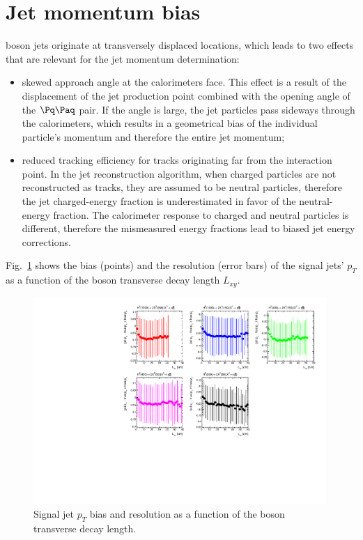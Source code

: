 \section{Jet momentum bias}
\label{sec:ptbias}

\X boson jets originate at transversely displaced locations, which leads to two effects 
that are relevant for the jet 
momentum determination:
\begin{itemize}
 \item skewed approach angle at the calorimeters face. This effect is a result of the displacement 
of the jet production point combined with the opening angle of the $\qq$ pair.
If the angle is large, the jet particles pass sideways through the calorimeters, 
 which results in a geometrical bias of the individual
particle's momentum and therefore the entire jet momentum;  
 \item reduced tracking efficiency for tracks originating far from the interaction point. 
In the jet reconstruction algorithm, when charged particles
are not reconstructed as tracks, they are assumed to be neutral particles, therefore the jet 
charged-energy fraction is underestimated in favor of the neutral-energy fraction. 
The calorimeter response to charged and neutral particles is different,
therefore the mismeasured energy fractions lead to biased jet energy corrections.
\end{itemize}
Fig.~\ref{fig:jetbias} shows the bias (points) and the resolution (error bars) of the signal jets' $p_T$ as a function of the \X boson transverse decay length $L_{xy}$.

\begin{figure}[htbp]
\centering
\includegraphics[width=0.99\textwidth]{plots/signal/biaslxy.pdf}
\caption{Signal jet $p_T$ bias and resolution as a function of the \X boson transverse decay length.\label{fig:jetbias}}
\end{figure} 
   
